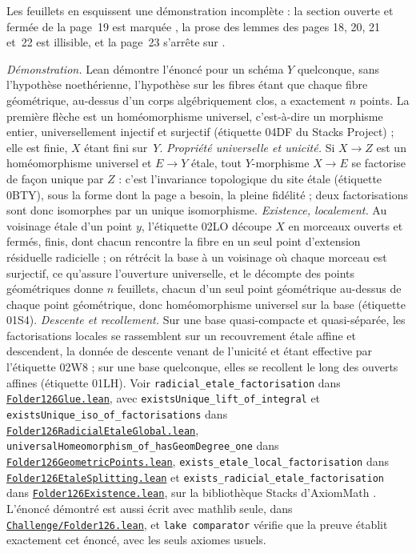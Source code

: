 {\small\raggedright Les feuillets en esquissent une démonstration incomplète : la section ouverte et fermée de la page~19 est marquée \q{[vérif]}, la prose des lemmes des pages 18, 20, 21 et~22 est illisible, et la page~23 s'arrête sur .

\emph{Démonstration.} Lean démontre l'énoncé pour un schéma $Y$ quelconque, sans l'hypothèse noethérienne, l'hypothèse sur les fibres étant que chaque fibre géométrique, au-dessus d'un corps algébriquement clos, a exactement $n$ points. La première flèche est un homéomorphisme universel, c'est-à-dire un morphisme entier, universellement injectif et surjectif (étiquette 04DF du Stacks Project) ; elle est finie, $X$ étant fini sur~$Y$. \emph{Propriété universelle et unicité.} Si $X \to Z$ est un homéomorphisme universel et $E \to Y$ étale, tout $Y$-morphisme $X \to E$ se factorise de façon unique par $Z$ : c'est l'invariance topologique du site étale (étiquette 0BTY), sous la forme dont la page a besoin, la pleine fidélité ; deux factorisations sont donc isomorphes par un unique isomorphisme. \emph{Existence, localement.} Au voisinage étale d'un point $y$, l'étiquette 02LO découpe $X$ en morceaux ouverts et fermés, finis, dont chacun rencontre la fibre en un seul point d'extension résiduelle radicielle ; on rétrécit la base à un voisinage où chaque morceau est surjectif, ce qu'assure l'ouverture universelle, et le décompte des points géométriques donne $n$ feuillets, chacun d'un seul point géométrique au-dessus de chaque point géométrique, donc homéomorphisme universel sur la base (étiquette 01S4). \emph{Descente et recollement.} Sur une base quasi-compacte et quasi-séparée, les factorisations locales se rassemblent sur un recouvrement étale affine et descendent, la donnée de descente venant de l'unicité et étant effective par l'étiquette 02W8 ; sur une base quelconque, elles se recollent le long des ouverts affines (étiquette 01LH). Voir \texttt{radicial\_etale\_factorisation} dans \href{\leanblobmain/AlgebraicGeometry/Folder126Glue.lean}{\texttt{Folder126Glue.\allowbreak{}lean}}, avec \texttt{existsUnique\_lift\_of\_integral} et \texttt{existsUnique\_iso\_of\_factorisations} dans \href{\leanblobmain/AlgebraicGeometry/Folder126RadicialEtaleGlobal.lean}{\texttt{Folder126RadicialEtaleGlobal.\allowbreak{}lean}}, \texttt{universalHomeomorphism\_of\_hasGeomDegree\_one} dans \href{\leanblobmain/AlgebraicGeometry/Folder126GeometricPoints.lean}{\texttt{Folder126GeometricPoints.\allowbreak{}lean}}, \texttt{exists\_etale\_local\_factorisation} dans \href{\leanblobmain/AlgebraicGeometry/Folder126EtaleSplitting.lean}{\texttt{Folder126EtaleSplitting.\allowbreak{}lean}} et \texttt{exists\_radicial\_etale\_factorisation} dans \href{\leanblobmain/AlgebraicGeometry/Folder126Existence.lean}{\texttt{Folder126Existence.\allowbreak{}lean}}, sur la bibliothèque Stacks d'AxiomMath \cite{axiomstacks}. L'énoncé démontré est aussi écrit avec mathlib seule, dans \href{https://github.com/Commutator-IO/GrothendieckArchivesProofs/blob/main/Challenge/Folder126.lean}{\texttt{Challenge/Folder126.\allowbreak{}lean}}, et \texttt{lake comparator} vérifie que la preuve établit exactement cet énoncé, avec les seuls axiomes usuels.

}
